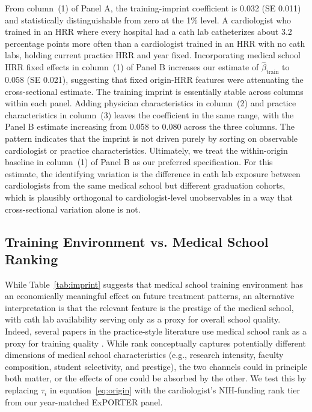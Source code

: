 \documentclass[12pt]{article}
\begin{document}
From column~(1) of Panel A, the training-imprint coefficient is 0.032 (SE 0.011) and statistically distinguishable from zero at the 1\% level. A cardiologist who trained in an HRR where every hospital had a cath lab catheterizes about 3.2 percentage points more often than a cardiologist trained in an HRR with no cath labs, holding current practice HRR and year fixed. Incorporating medical school HRR fixed effects in column~(1) of Panel B increases our estimate of $\hat\beta_{\text{train}}$ to 0.058 (SE 0.021), suggesting that fixed origin-HRR features were attenuating the cross-sectional estimate. The training imprint is essentially stable across columns within each panel. Adding physician characteristics in column~(2) and practice characteristics in column~(3) leaves the coefficient in the same range, with the Panel B estimate increasing from 0.058 to 0.080 across the three columns. The pattern indicates that the imprint is not driven purely by sorting on observable cardiologist or practice characteristics. Ultimately, we treat the within-origin baseline in column~(1) of Panel B as our preferred specification. For this estimate, the identifying variation is the difference in cath lab exposure between cardiologists from the same medical school but different graduation cohorts, which is plausibly orthogonal to cardiologist-level unobservables in a way that cross-sectional variation alone is not.

\subsection{Training Environment vs. Medical School Ranking}\label{sec:imprint-rank}

While Table~\ref{tab:imprint} suggests that medical school training environment has an economically meaningful effect on future treatment patterns, an alternative interpretation is that the relevant feature is the prestige of the medical school, with cath lab availability serving only as a proxy for overall school quality. Indeed, several papers in the practice-style literature use medical school rank as a proxy for training quality \citep{schnell2018, doyle_jr_returns_2010}. While rank conceptually captures potentially different dimensions of medical school characteristics (e.g., research intensity, faculty composition, student selectivity, and prestige), the two channels could in principle both matter, or the effects of one could be absorbed by the other. We test this by replacing $\tau_i$ in equation~\eqref{eq:origin} with the cardiologist's NIH-funding rank tier from our year-matched ExPORTER panel.
\end{document}
